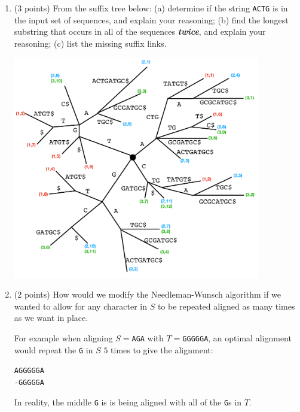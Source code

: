 \documentclass[11pt, oneside]{article}   	%
\begin{document}
\begin{enumerate}
 \clearpage
 \item (3 points) From the suffix tree below: 
(a) determine if the string \texttt{ACTG} is in the input set of sequences, and explain your reasoning;  
(b) find the longest substring that occurs in all of the sequences \textbf{\textit{twice}}, and explain your reasoning;
(c) list the missing suffix links. 
\begin{center}
\includegraphics[width=0.85\textwidth]{Midterm_4}
\end{center}


\clearpage
\item (2 points) How would we modify the Needleman-Wunsch algorithm if we wanted to allow for any character in $S$ to be repeated aligned as many times as we want in place.

For example when aligning $S=$\texttt{AGA} with $T=$\texttt{GGGGGA}, an optimal alignment would repeat the \texttt{G} in $S$ $5$ times to give the alignment:
\begin{center}
\texttt{AG{\color{gray!60}GGGG}A}\\
\texttt{-GGGGGA}
\end{center}
In reality, the middle \texttt{G} is is being aligned with all of the \texttt{G}s in $T$.

\end{enumerate}
\end{document}
